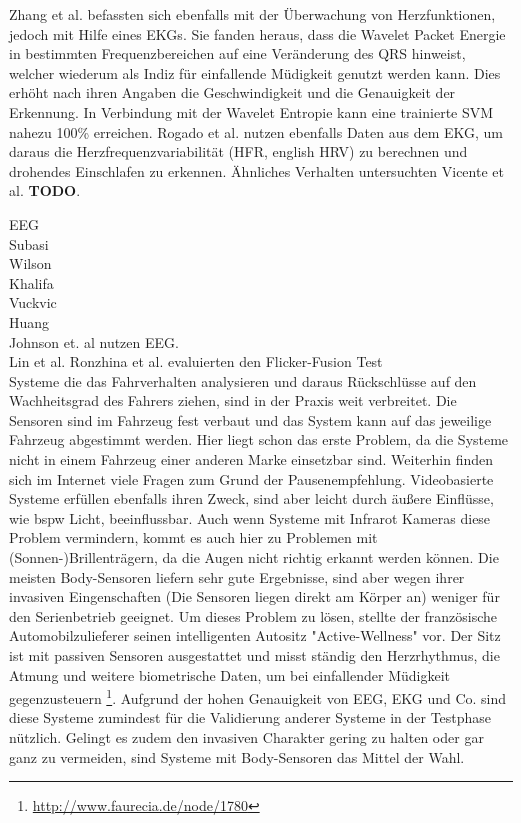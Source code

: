 {Zhang et al. \cite{zhang_6513058} befassten sich ebenfalls mit der Überwachung von Herzfunktionen, jedoch mit Hilfe eines EKGs. Sie fanden heraus, dass die Wavelet Packet Energie in bestimmten Frequenzbereichen auf eine Veränderung des QRS hinweist, welcher wiederum als Indiz für einfallende Müdigkeit genutzt werden kann. Dies erhöht nach ihren Angaben die Geschwindigkeit und die Genauigkeit der Erkennung. In Verbindung mit der Wavelet Entropie kann eine trainierte SVM nahezu 100\% erreichen. Rogado et al. \cite{Rogado_4913155} nutzen ebenfalls Daten aus dem EKG, um daraus die Herzfrequenzvariabilität (HFR, english HRV) zu berechnen und drohendes Einschlafen zu erkennen. Ähnliches Verhalten untersuchten Vicente et al. \cite{Vicente_6164509} \textbf{TODO}.  

EEG \\
Subasi \cite{Subasi:2005:ARA:1707423.1707550}\\
Wilson \cite{wilson_890161}\\
Khalifa \cite{khalifa_893852}\\
Vuckvic \cite{Vuckovic2002349}\\
Huang \cite{Huang_548971}\\
Johnson et. al \cite{Johnson11} nutzen EEG.\\
Lin et al. \cite{Lin05eeg-baseddrowsiness}
Ronzhina et al. \cite{Ronzhina:2011:UEV:2093698.2093733} evaluierten den Flicker-Fusion Test \\



Systeme die das Fahrverhalten analysieren und daraus Rückschlüsse auf den Wachheitsgrad des Fahrers ziehen, sind in der Praxis weit verbreitet. Die Sensoren sind im Fahrzeug fest verbaut und das System kann auf das jeweilige Fahrzeug abgestimmt werden. Hier liegt schon das erste Problem, da die Systeme nicht in einem Fahrzeug einer anderen Marke einsetzbar sind. Weiterhin finden sich im Internet viele Fragen zum Grund der Pausenempfehlung. Videobasierte Systeme erfüllen ebenfalls ihren Zweck, sind aber leicht durch äußere Einflüsse, wie \acl{bspw} Licht, beeinflussbar. Auch wenn Systeme mit Infrarot Kameras diese Problem vermindern, kommt es auch hier zu Problemen mit (Sonnen-)Brillenträgern, da die Augen nicht richtig erkannt werden können. Die meisten Body-Sensoren liefern sehr gute Ergebnisse, sind aber wegen ihrer invasiven Eingenschaften (Die Sensoren liegen direkt am Körper an) weniger für den Serienbetrieb geeignet. Um dieses Problem zu lösen, stellte der französische Automobilzulieferer seinen intelligenten Autositz "Active-Wellness" vor. Der Sitz ist mit passiven Sensoren ausgestattet und misst ständig den Herzrhythmus, die Atmung und weitere biometrische Daten, um bei einfallender Müdigkeit gegenzusteuern \footnote{\url{http://www.faurecia.de/node/1780}}. 
Aufgrund der hohen Genauigkeit von EEG, EKG und Co. sind diese Systeme zumindest für die Validierung anderer Systeme in der Testphase nützlich. Gelingt es zudem den invasiven Charakter gering zu halten oder gar ganz zu vermeiden, sind Systeme mit Body-Sensoren das Mittel der Wahl.\\

}
